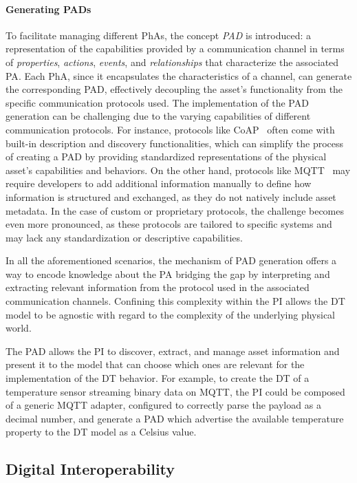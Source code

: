 \paragraph{Generating \aclp{PAD}}
To facilitate managing different \acp{PhA}, the concept \emph{\ac{PAD}} is introduced: a representation of the capabilities provided by a communication channel in terms of \emph{properties}, \emph{actions}, \emph{events}, and \emph{relationships} that characterize the associated \ac{PA}.
%
Each \ac{PhA}, since it encapsulates the characteristics of a channel, can generate the corresponding \ac{PAD}, effectively decoupling the asset's functionality from the specific communication protocols used.
%
The implementation of the \ac{PAD} generation can be challenging due to the varying capabilities of different communication protocols.
For instance, protocols like \ac{CoAP}~\cite{RFC7252} often come with built-in description and discovery functionalities, which can simplify the process of creating a \ac{PAD} by providing standardized representations of the physical asset's capabilities and behaviors.
On the other hand, protocols like \ac{MQTT}~\cite{MQTTv5} may require developers to add additional information manually to define how information is structured and exchanged, as they do not natively include asset metadata.
In the case of custom or proprietary protocols, the challenge becomes even more pronounced, as these protocols are tailored to specific systems and may lack any standardization or descriptive capabilities.

In all the aforementioned scenarios, the mechanism of \ac{PAD} generation offers a way to encode knowledge about the \ac{PA} bridging the gap by interpreting and extracting relevant information from the protocol used in the associated communication channels.
%
Confining this complexity within the \ac{PI} allows the \ac{DT} model to be agnostic with regard to the complexity of the underlying physical world.

The \ac{PAD} allows the \ac{PI} to discover, extract, and manage asset information and present it to the model that can choose which ones are relevant for the implementation of the \ac{DT} behavior.
%
For example, to create the \ac{DT} of a temperature sensor streaming binary data on MQTT, the \ac{PI} could be composed of a generic MQTT adapter, configured to correctly parse the payload as a decimal number, and generate a \ac{PAD} which advertise the available temperature property to the \ac{DT} model as a Celsius value. 


\subsection{Digital Interoperability}
\label{sec:digital_interoperability}

